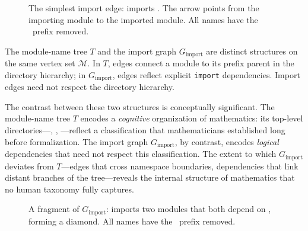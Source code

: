 \begin{figure}[H]
\centering
{}
\caption{The simplest import edge:  imports . The arrow points from the importing module to the imported module. All names have the \ prefix removed.}
\label{fig:single-import-edge}
\end{figure}

\begin{remark}
The module-name tree $T$ and the import graph $G_{\mathrm{import}}$ are distinct structures on the same vertex set $\mathcal{M}$. In $T$, edges connect a module to its prefix parent in the directory hierarchy; in $G_{\mathrm{import}}$, edges reflect explicit \texttt{import} dependencies. Import edges need not respect the directory hierarchy.
\end{remark}

The contrast between these two structures is conceptually significant. The module-name tree $T$ encodes a \emph{cognitive} organization of mathematics: its top-level directories---, , ---reflect a classification that mathematicians established long before formalization. The import graph $G_{\mathrm{import}}$, by contrast, encodes \emph{logical} dependencies that need not respect this classification. The extent to which $G_{\mathrm{import}}$ deviates from $T$---edges that cross namespace boundaries, dependencies that link distant branches of the tree---reveals the internal structure of mathematics that no human taxonomy fully captures.

\begin{figure}[ht]
\centering
{}
\caption{A fragment of $G_{\mathrm{import}}$:  imports two modules that both depend on , forming a diamond. All names have the \ prefix removed.}
\label{fig:import-subgraph}
\end{figure}

